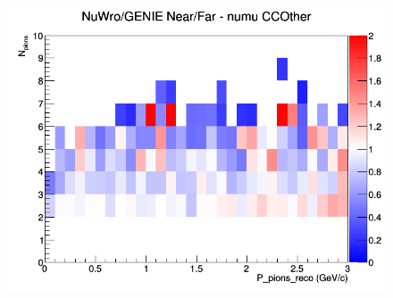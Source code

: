 \documentclass[12pt]{article}
\begin{document}
\begin{figure}[h]
\endminipage
{}
\includegraphics[width=\linewidth]{eff_N_P/LAr/pions/ratios/CCOther_NuWro_GENIE_numu_NF_N_P.png}
\endminipage
\newline
\end{figure}
\clearpage
\end{document}
